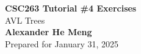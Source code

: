 \begin{titlepage}
    \null %
    \vfill
    \begin{center}
        {\fontsize{35}{48}\selectfont \bfseries CSC263 Tutorial \#4 Exercises}
        \vspace{20pt} \\
        {\LARGE AVL Trees} \\
        \vspace{20pt}
        \textbf{Alexander He Meng}
        \vspace{8pt}
        \\ Prepared for January 31, 2025
    \end{center}
    \vfill
\end{titlepage}
